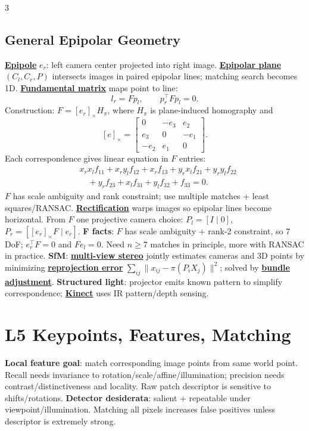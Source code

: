 \documentclass{article}
\numberwithin{equation}{subsection}
\newcommand{\key}[1]{\textbf{#1}}
\newcommand{\lowterm}[1]{\textbf{\underline{#1}}}
\begin{document}
\begin{multicols*}{3}
\subsection{General Epipolar Geometry}
\lowterm{Epipole} $e_r$: left camera center projected into right image. \lowterm{Epipolar plane} $(C_l,C_r,P)$ intersects images in paired epipolar lines; matching search becomes 1D. \lowterm{Fundamental matrix} maps point to line:
\[
l_r=Fp_l,\qquad p_r^\top Fp_l=0.
\]
Construction: $F=[e_r]_\times H_\pi$, where $H_\pi$ is plane-induced homography and
\[
[e]_\times=\begin{bmatrix}0&-e_3&e_2\\e_3&0&-e_1\\-e_2&e_1&0\end{bmatrix}.
\]
Each correspondence gives linear equation in $F$ entries:
\[
\begin{aligned}
&x_rx_lf_{11}+x_ry_lf_{12}+x_rf_{13}
+y_rx_lf_{21}+y_ry_lf_{22}\\
&\quad +y_rf_{23}+x_lf_{31}+y_lf_{32}+f_{33}=0 .
\end{aligned}
\]
$F$ has scale ambiguity and rank constraint; use multiple matches + least squares/RANSAC. \lowterm{Rectification} warps images so epipolar lines become horizontal. From $F$ one projective camera choice: $P_l=[I\mid0]$, $P_r=[[e_r]_\times F\mid e_r]$.
\key{F facts}: $F$ has scale ambiguity + rank-2 constraint, so 7 DoF; $e_r^\top F=0$ and $Fe_l=0$. Need $n\ge7$ matches in principle, more with RANSAC in practice. \key{SfM}: \lowterm{multi-view stereo} jointly estimates cameras and 3D points by minimizing \lowterm{reprojection error} $\sum_{ij}\|x_{ij}-\pi(P_iX_j)\|^2$; solved by \lowterm{bundle adjustment}. \key{Structured light}: projector emits known pattern to simplify correspondence; \lowterm{Kinect} uses IR pattern/depth sensing.

\section{L5 Keypoints, Features, Matching}
\key{Local feature goal}: match corresponding image points from same world point. Recall needs invariance to rotation/scale/affine/illumination; precision needs contrast/distinctiveness and locality. Raw patch descriptor is sensitive to shifts/rotations.
\key{Detector desiderata}: salient + repeatable under viewpoint/illumination. Matching all pixels increases false positives unless descriptor is extremely strong.

\end{multicols*}
\end{document}
